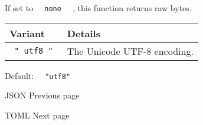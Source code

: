 If set to \texttt{\ }{\texttt{\ none\ }}\texttt{\ } , this function
returns raw bytes.

\begin{longtable}[]{@{}ll@{}}
\toprule\noalign{}
Variant & Details \\
\midrule\noalign{}
\endhead
\bottomrule\noalign{}
\endlastfoot
\texttt{\ "\ utf8\ "\ } & The Unicode UTF-8 encoding. \\
\end{longtable}

Default: \texttt{\ }{\texttt{\ "utf8"\ }}\texttt{\ }

\href{/docs/reference/data-loading/json/}{\pandocbounded{}}

{ JSON } { Previous page }

\href{/docs/reference/data-loading/toml/}{\pandocbounded{}}

{ TOML } { Next page }


